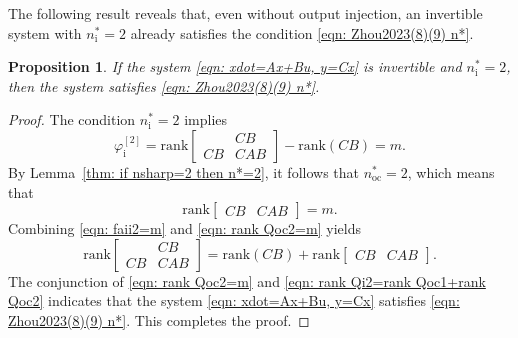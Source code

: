 \documentclass[sort&compress]{elsarticle}
\newtheorem{prop}{Proposition}
\newcommand\faii{\varphi_\mathrm i}
\newcommand\nsharp{n_\mathrm i^*}
\newcommand\nocstar{n_\mathrm{oc}^*}
\newcommand\rank{\mathrm{rank}}
\begin{document}
The following result reveals that,
even without output injection,
an invertible system with $\nsharp=2$ already satisfies
the condition \eqref{eqn: Zhou2023(8)(9) n*}.

\begin{prop}\label{thm:ifnsharp=2}
If the system \eqref{eqn: xdot=Ax+Bu, y=Cx} is invertible and $\nsharp=2$,
then the system satisfies
\eqref{eqn: Zhou2023(8)(9) n*}.
\end{prop}

\begin{proof}
The condition $\nsharp=2$ implies
\begin{equation}\label{eqn: faii2=m}
\faii^{[2]}=\rank\begin{bmatrix}&CB\\ CB&CAB\end{bmatrix}-\rank(CB)=m.
\end{equation}
By Lemma~\ref{thm: if nsharp=2 then n*=2},
it follows that $\nocstar=2$, which means that
\begin{equation}\label{eqn: rank Qoc2=m}
\rank\begin{bmatrix}CB&CAB\end{bmatrix}=m.
\end{equation}
Combining \eqref{eqn: faii2=m}
and \eqref{eqn: rank Qoc2=m} yields
\begin{equation}\label{eqn: rank Qi2=rank Qoc1+rank Qoc2}
\rank\begin{bmatrix}&CB\\ CB&CAB\end{bmatrix}=\rank(CB)
+\rank\begin{bmatrix}CB&CAB\end{bmatrix}.
\end{equation}
The conjunction of \eqref{eqn: rank Qoc2=m} and
\eqref{eqn: rank Qi2=rank Qoc1+rank Qoc2}
indicates that the system \eqref{eqn: xdot=Ax+Bu, y=Cx} satisfies
\eqref{eqn: Zhou2023(8)(9) n*}.
This completes the proof.
\end{proof}
\end{document}
